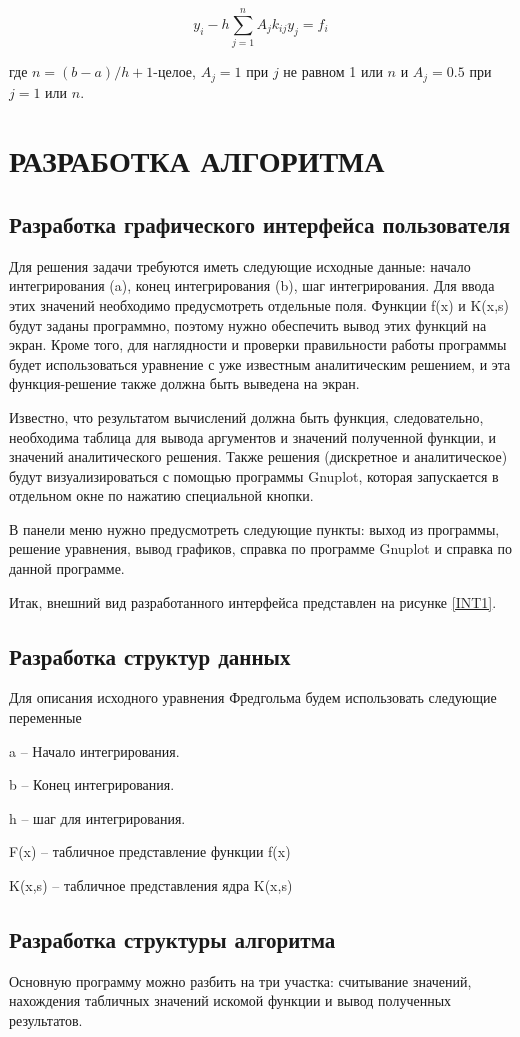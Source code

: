 $$y_i-h\sum_{j=1}^n A_j k_{ij} y_j = f_i$$

где $n=(b-a)/h+1$-целое, $A_j=1$ при $j$ не равном 1 или $n$ и $A_j=0.5$ при $j=1$ или $n$. 

\section{РАЗРАБОТКА АЛГОРИТМА}
\subsection{Разработка графического интерфейса пользователя}
Для решения задачи требуются иметь следующие исходные данные: начало интегрирования (a), конец интегрирования (b), шаг интегрирования. Для ввода этих значений необходимо предусмотреть отдельные поля. Функции f(x) и K(x,s) будут заданы программно, поэтому нужно обеспечить вывод этих функций на экран. Кроме того, для наглядности и проверки правильности работы программы будет использоваться уравнение с уже известным аналитическим решением, и эта функция-решение также должна быть выведена на экран.

Известно, что результатом вычислений должна быть функция, следовательно, необходима таблица для вывода аргументов и значений полученной функции, и значений аналитического решения. Также решения (дискретное и аналитическое) будут визуализироваться с помощью программы Gnuplot, которая запускается в отдельном окне по нажатию специальной кнопки.

В панели меню нужно предусмотреть следующие пункты: выход из программы, решение уравнения, вывод графиков, справка по программе Gnuplot и справка по данной программе. 

Итак, внешний вид разработанного интерфейса представлен на рисунке \ref{INT1}.
\subsection{Разработка структур данных}
Для описания исходного уравнения Фредгольма будем использовать следующие переменные

a – Начало интегрирования.

b – Конец интегрирования. 

h – шаг для интегрирования. 

F(x) – табличное представление функции f(x)

K(x,s) – табличное представления ядра K(x,s)
\subsection{Разработка структуры алгоритма}
Основную программу можно разбить на три участка: считывание значений, нахождения табличных значений искомой функции и вывод полученных результатов.

